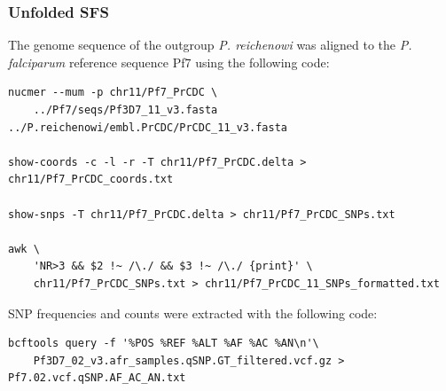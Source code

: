 \documentclass[11pt]{article}
\begin{document}
\subsubsection*{Unfolded SFS}
\label{sec:orga6330ae}
The genome sequence of the outgroup \emph{P. reichenowi} was aligned to the \emph{P. falciparum} reference sequence Pf7 using the following code:
\begin{verbatim}
nucmer --mum -p chr11/Pf7_PrCDC \
    ../Pf7/seqs/Pf3D7_11_v3.fasta ../P.reichenowi/embl.PrCDC/PrCDC_11_v3.fasta

show-coords -c -l -r -T chr11/Pf7_PrCDC.delta > chr11/Pf7_PrCDC_coords.txt

show-snps -T chr11/Pf7_PrCDC.delta > chr11/Pf7_PrCDC_SNPs.txt

awk \
    'NR>3 && $2 !~ /\./ && $3 !~ /\./ {print}' \
    chr11/Pf7_PrCDC_SNPs.txt > chr11/Pf7_PrCDC_11_SNPs_formatted.txt
\end{verbatim}

SNP frequencies and counts were extracted with the following code:
\begin{verbatim}
bcftools query -f '%POS %REF %ALT %AF %AC %AN\n'\
    Pf3D7_02_v3.afr_samples.qSNP.GT_filtered.vcf.gz > Pf7.02.vcf.qSNP.AF_AC_AN.txt
\end{verbatim}
\end{document}

